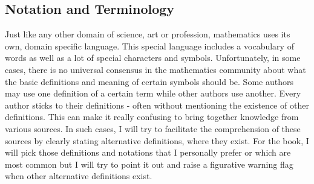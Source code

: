 




\subsection{Notation and Terminology}
Just like any other domain of science, art or profession, mathematics uses its own, domain specific language. This special language includes a vocabulary of words as well as a lot of special characters and symbols. Unfortunately, in some cases, there is no universal consensus in the mathematics community about what the basic definitions and meaning of certain symbols should be. Some authors may use one definition of a certain term while other authors use another. Every author sticks to their definitions - often without mentioning the existence of other definitions. This can make it really confusing to bring together knowledge from various sources. In such cases, I will try to facilitate the comprehension of these sources by clearly stating alternative definitions, where they exist. For the book, I will pick those definitions and notations that I personally prefer or which are most common but I will try to point it out and raise a figurative warning flag when other alternative definitions exist.

